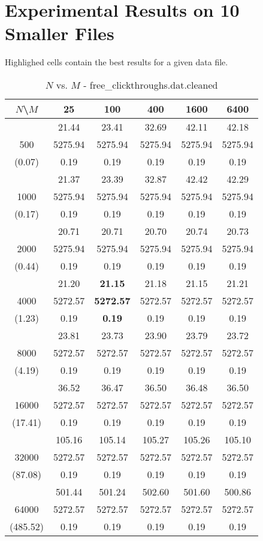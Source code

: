\documentclass[conference]{IEEEtran}
\begin{document}
\section{Experimental Results on 10 Smaller Files}
Highlighed cells contain the best results for a given data file.

\begin{table}[th]
\caption{$N$ vs. $M$ - free\_clickthroughs.dat.cleaned}
\label{tab:free_clickthroughs.dat.cleaned}
\centering
\begin{tabular}{|c||c|c|c|c|c|}
\hline
$N$\textbackslash $M$ & 25 & 100 & 400 & 1600 & 6400 \\ \hline \hline
  & 21.44 & 23.41 & 32.69 & 42.11 & 42.18\\ 
500  & 5275.94 & 5275.94 & 5275.94 & 5275.94 & 5275.94\\ 
(0.07)  & 0.19 & 0.19 & 0.19 & 0.19 & 0.19\\ \hline 
  & 21.37 & 23.39 & 32.87 & 42.42 & 42.29\\ 
1000  & 5275.94 & 5275.94 & 5275.94 & 5275.94 & 5275.94\\ 
(0.17)  & 0.19 & 0.19 & 0.19 & 0.19 & 0.19\\ \hline 
  & 20.71 & 20.71 & 20.70 & 20.74 & 20.73\\ 
2000  & 5275.94 & 5275.94 & 5275.94 & 5275.94 & 5275.94\\ 
(0.44)  & 0.19 & 0.19 & 0.19 & 0.19 & 0.19\\ \hline 
  & 21.20 & {\bf 21.15} & 21.18 & 21.15 & 21.21\\ 
4000  & 5272.57 & {\bf 5272.57} & 5272.57 & 5272.57 & 5272.57\\ 
(1.23)  & 0.19 & {\bf 0.19} & 0.19 & 0.19 & 0.19\\ \hline 
  & 23.81 & 23.73 & 23.90 & 23.79 & 23.72\\ 
8000  & 5272.57 & 5272.57 & 5272.57 & 5272.57 & 5272.57\\ 
(4.19)  & 0.19 & 0.19 & 0.19 & 0.19 & 0.19\\ \hline 
  & 36.52 & 36.47 & 36.50 & 36.48 & 36.50\\ 
16000  & 5272.57 & 5272.57 & 5272.57 & 5272.57 & 5272.57\\ 
(17.41)  & 0.19 & 0.19 & 0.19 & 0.19 & 0.19\\ \hline 
  & 105.16 & 105.14 & 105.27 & 105.26 & 105.10\\ 
32000  & 5272.57 & 5272.57 & 5272.57 & 5272.57 & 5272.57\\ 
(87.08)  & 0.19 & 0.19 & 0.19 & 0.19 & 0.19\\ \hline 
  & 501.44 & 501.24 & 502.60 & 501.60 & 500.86\\ 
64000  & 5272.57 & 5272.57 & 5272.57 & 5272.57 & 5272.57\\ 
(485.52)  & 0.19 & 0.19 & 0.19 & 0.19 & 0.19\\ \hline 
\end{tabular}
\end{table}
\end{document}
